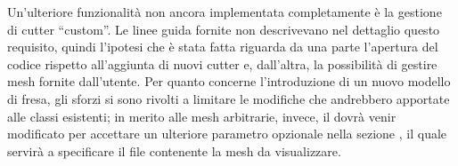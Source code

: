 Un'ulteriore funzionalità non ancora implementata completamente è la gestione di cutter ``custom''. Le linee guida fornite non descrivevano nel dettaglio questo requisito, quindi l'ipotesi che è stata fatta riguarda da una parte l'apertura del codice rispetto all'aggiunta di nuovi cutter e, dall'altra, la possibilità di gestire mesh fornite dall'utente. Per quanto concerne l'introduzione di un nuovo modello di fresa, gli sforzi si sono rivolti a limitare le modifiche che andrebbero apportate alle classi esistenti; in merito alle mesh arbitrarie, invece, il  dovrà venir modificato per accettare un ulteriore parametro opzionale nella sezione \code{[TOOL]}, il quale servirà a specificare il file contenente la mesh da visualizzare.